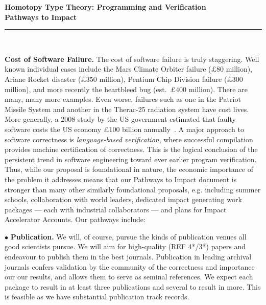 \documentclass[a4paper,11pt]{article}
\begin{document}
\thispagestyle{plain}

\begin{center}

  {\Large {\bf Homotopy Type Theory: Programming and Verification \\
\vspace{0.2in} 
Pathways to Impact}}\\[1ex]   



\vspace*{-0.1in}



  \rule{150mm}{.5mm}\\[2ex]

\end{center}



\noindent



\vspace*{-0.1in}

{\bf Cost of Software Failure.} The cost of software failure is truly
staggering. Well known individual cases include the Mars Climate
Orbiter failure ($\pounds 80$ million), Ariane Rocket disaster
($\pounds 350$ million), Pentium Chip Division failure ($\pounds 300$
million), and more recently the heartbleed bug (est.\ $\pounds 400$
million).  There are many, many more examples. Even worse, 
failures such as one in the Patriot Missile System and
another in the Therac-25 radiation system have cost lives. More
generally, a 2008 study by the US government estimated that faulty
software costs the US economy $\pounds 100$ billion
annually~\cite{cnet08}.  A
major approach to software correctness is {\em language-based
  verification}, where successful compilation provides machine
certification of correctness. This is the logical conclusion of the
persistent trend in software engineering toward ever earlier program
verification. Thus, while our proposal is foundational in nature, the
economic importance of the problem it addresses means that our
Pathways to Impact document is stronger than many other similarly
foundational proposals, e.g. including summer schools, collaboration
with world leaders, dedicated impact generating work packages --- each
with industrial collaborators --- and plans for Impact Accelerator
Accounts. Our pathways include:

\vspace*{0.02in}

$\bullet$ {\bf Publication.} We will, of course, pursue the kinds of
publication venues all good scientists pursue. We will
aim for high-quality (REF 4*/3*) papers and endeavour to publish them in the best
journals. Publication in leading archival journals 
confers validation by the community of the correctness and importance
our our results, and allows them to serve as seminal references.
We expect each package to result in at least three
publications and several to result in more. This is feasible as we
have substantial publication track records.
\end{document}
